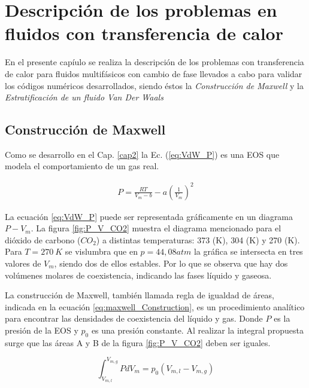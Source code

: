 \chapter{Descripción de los problemas en fluidos con transferencia de calor }
\graphicspath{{figs/cap4/}}
\label{cap4}

En el presente capíulo se realiza la descripción de los problemas con transferencia de calor para fluidos multifásicos con cambio de fase llevados a cabo para validar los códigos numéricos desarrollados, siendo éstos la \textit{Construcción de Maxwell} y la \textit{Estratificación de un fluido Van Der Waals}

\section{Construcción de Maxwell}

Como se desarrollo en el Cap. \ref{cap2} la Ec. (\ref{eq:VdW_P}) es una EOS que modela el comportamiento de un gas real.

\begin{align*}
	P = \frac{R T}{V_m - b} - a {(\frac{1}{V_m})}^2
\end{align*}

La ecuación \ref{eq:VdW_P} puede ser representada gráficamente en un diagrama $P - V_m$. La figura \ref{fig:P_V_CO2} muestra el diagrama mencionado para el dióxido de carbono ($CO_2$) a distintas temperaturas: 373 (K), 304 (K) y 270 (K). Para $T = 270 \> K$ se vislumbra que en $p = 44,08 atm$ la gráfica se intersecta en tres valores de $V_m$, siendo dos de ellos estables. Por lo que se observa que hay dos volúmenes molares de coexistencia, indicando las fases líquido y gaseosa.

La construcción de Maxwell, también llamada regla de igualdad de áreas, indicada en la ecuación \ref{eq:maxwell_Construction}, es un procedimiento analítico para encontrar las densidades de coexistencia del líquido y gas. Donde $P$ es la presión de la EOS y $p_0$ es una presión constante. Al realizar la integral propuesta surge que las áreas A y B de la figura \ref{fig:P_V_CO2} deben ser iguales.

\begin{equation}
\int_{V_{m,l}}^{V_{m,g}} P d V_m = p_0 (V_{m,l} -  V_{m,g})
\label{eq:maxwell_Construction}
\end{equation}

